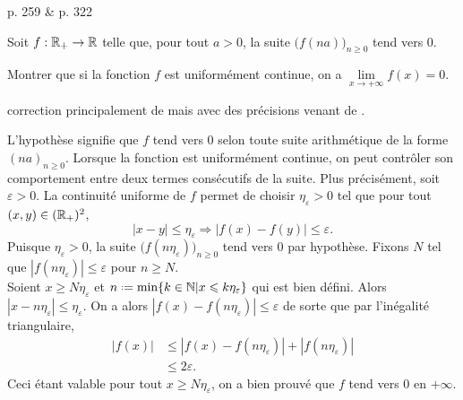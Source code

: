 \cite{exos_oraux} p. 259 \& \cite{oraux_x_ens_3} p. 322

\begin{lemme}
    Soit $f : \mathbb{R}_+ \to \mathbb{R}$ telle que, pour tout $a > 0$, la suite $\big(f(na) \big)_{n \geqslant 0}$ tend vers 0.
    \item Montrer que si la fonction $f$ est uniformément continue, on a $\lim\limits_{x \to + \infty} f(x) = 0$.
\end{lemme}

correction principalement de \cite{oraux_x_ens_3} mais avec des précisions venant de \cite{exos_oraux}.

\begin{preuve}
    L'hypothèse signifie que $f$ tend vers $0$ selon toute suite arithmétique de la forme $(na)_{n \geqslant 0}$. Lorsque la fonction est uniformément continue, on peut contrôler son comportement entre deux termes consécutifs de la suite. Plus précisément, soit $\varepsilon > 0$. La continuité uniforme de $f$ permet de choisir $\eta_\varepsilon > 0$ tel que pour tout $(x, y) \in (\mathbb{R}_+)^2$, 
    $$|x-y| \leqslant \eta_\varepsilon \Rightarrow |f(x) - f(y)| \leqslant \varepsilon.$$
    Puisque $\eta_\varepsilon > 0$, la suite $\big(f(n\eta_\varepsilon)\big)_{n \geqslant 0}$ tend vers $0$ par hypothèse. Fixons $N$ tel que $|f(n \eta_\varepsilon)| \leqslant \varepsilon$ pour $n \geqslant N$. \\
    Soient $x \geqslant N \eta_\varepsilon$ et $n \defeq \min\{ k \in \N | x \leqslant k \eta_\varepsilon \}$ qui est bien défini. Alors $|x-n\eta_\varepsilon| \leqslant \eta_\varepsilon$. On a alors $|f(x) - f(n \eta_\varepsilon)| \leqslant \varepsilon$ de sorte que par l'inégalité triangulaire, 
    \begin{align*}
        |f(x)| &\leqslant |f(x) - f(n \eta_\varepsilon)| + |f(n \eta_\varepsilon)| \\
        &\leqslant 2 \varepsilon.
    \end{align*}
    Ceci étant valable pour tout $x \geqslant N \eta_\varepsilon$, on a bien prouvé que $f$ tend vers $0$ en $+ \infty$.
\end{preuve}  

\begin{marginfigure}[-3cm]
    
\end{marginfigure}

